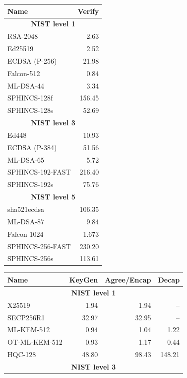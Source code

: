\documentclass[letterpaper,12pt,titlepage,oneside,final]{book}
\begin{document}
\begin{table}[ht]
    \centering\scriptsize
    \begin{tabular}[t]{lr}
    \toprule
        {\bf Name} & {\bf Verify} \\
    \midrule
        \multicolumn{2}{c}{\bf NIST level 1} \\
    \midrule
        RSA-2048 & 2.63 \\
        Ed25519 & 2.52 \\
        ECDSA (P-256) & 21.98 \\
        Falcon-512 & 0.84 \\
        ML-DSA-44 & 3.34 \\
        SPHINCS-128f & 156.45 \\
        SPHINCS-128s & 52.69 \\
    \midrule
        \multicolumn{2}{c}{\bf NIST level 3} \\
    \midrule
        Ed448 & 10.93 \\
        ECDSA (P-384) & 51.56 \\
        ML-DSA-65 & 5.72 \\
        SPHINCS-192-FAST & 216.40 \\
        SPHINCS-192s & 75.76 \\
    \midrule
        \multicolumn{2}{c}{\bf NIST level 5} \\
    \midrule
        sha521ecdsa & 106.35 \\
        ML-DSA-87 & 9.84 \\
        Falcon-1024 & 1.673 \\
        SPHINCS-256-FAST & 230.20 \\
        SPHINCS-256s & 113.61 \\
    \bottomrule
    \end{tabular}
    \begin{tabular}[t]{lrrr}
    \toprule
        {\bf Name} & {\bf KeyGen} & {\bf Agree/Encap} & {\bf Decap} \\
    \midrule
        \multicolumn{4}{c}{\bf NIST level 1} \\
    \midrule
        X25519 & 1.94 & 1.94 & -- \\
        SECP256R1 & 32.97 & 32.95 & -- \\
        ML-KEM-512 & 0.94 & 1.04 & 1.22 \\
        OT-ML-KEM-512 & 0.93 & 1.17 & 0.44 \\
        HQC-128 & 48.80 & 98.43 & 148.21 \\
    \midrule
        \multicolumn{4}{c}{\bf NIST level 3} \\

\end{tabular}
\end{table}
\end{document}
